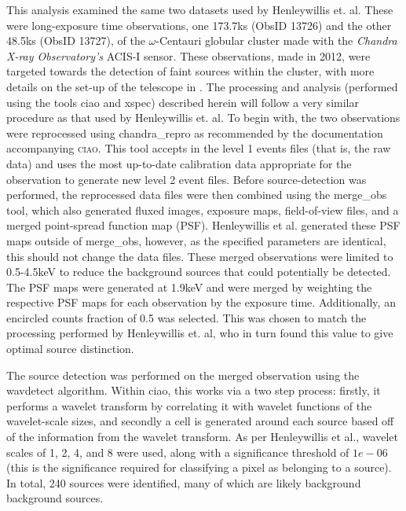 \documentclass[aps,
                pra,  
                a4paper, 
                amsmath, 
                amssymb, 
                preprint,
                tightenlines,  
                amsfonts,
                nofootinbib,
                notitlepage
            ]{revtex4-2}
\begin{document}
This analysis examined the same two datasets used by Henleywillis et. al. These were long-exposure time observations, one 173.7ks (ObsID 13726) and the other 48.5ks (ObsID 13727), of the $\omega$-Centauri globular cluster made with the {\it Chandra X-ray Observatory's} ACIS-I sensor. These observations, made in 2012, were targeted towards the detection of faint sources within the cluster, with more details on the set-up of the telescope in \cite{Henleywillis2018}. The processing and analysis (performed using the tools {\sc ciao} and {\sc xspec}) described herein will follow a very similar procedure as that used by Henleywillis et. al. To begin with, the two observations were reprocessed using {\sc chandra\_repro} as recommended by the documentation accompanying \textsc{ciao}. This tool accepts in the level 1 events files (that is, the raw data) and uses the most up-to-date calibration data appropriate for the observation to generate new level 2 event files. Before source-detection was performed, the reprocessed data files were then combined using the {\sc merge\_obs} tool, which also generated fluxed images, exposure maps, field-of-view files, and a merged point-spread function map (PSF). Henleywillis et al. generated these PSF maps outside of {\sc merge\_obs}, however, as the specified parameters are identical, this should not change the data files. These merged observations were limited to 0.5-4.5keV to reduce the background sources that could potentially be detected. The PSF maps were generated at 1.9keV and were merged by weighting the respective PSF maps for each observation by the exposure time. Additionally, an encircled counts fraction of 0.5 was selected. This was chosen to match the processing performed by Henleywillis et. al, who in turn found this value to give optimal source distinction. 
\par
The source detection was performed on the merged observation using the {\sc wavdetect} algorithm. Within {\sc ciao}, this works via a two step process: firstly, it performs a wavelet transform by correlating it with wavelet functions of the wavelet-scale sizes, and secondly a cell is generated around each source based off of the information from the wavelet transform. As per Henleywillis et al., wavelet scales of 1, 2, 4, and 8 were used, along with a significance threshold of $1e-06$ (this is the significance required for classifying a pixel as belonging to a source). In total, 240 sources were identified, many of which are likely background background sources. 
\par
\end{document}
